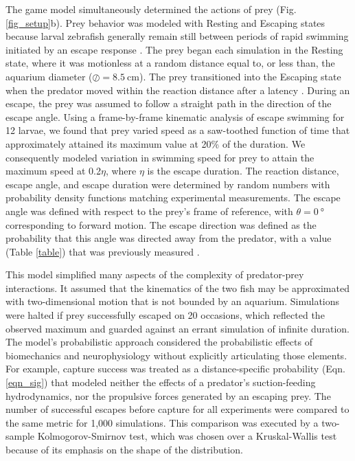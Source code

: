 \documentclass[]{rsos}%
\begin{document}
The game model simultaneously determined the actions of prey (Fig. \ref{fig_setup}b).
Prey behavior was modeled with Resting and Escaping states because larval zebrafish generally remain still between periods of rapid swimming initiated by an escape response \cite{Stewart:2013bha, Stewart:2014cma}. 
The prey began each simulation in the Resting state, where it was motionless at a random distance equal to, or less than, the aquarium diameter ($\oslash = \SI{8.5}{\cm}$).
The prey transitioned into the Escaping state when the predator moved within the reaction distance after a latency \cite{Nair:2015gk}.
During an escape, the prey was assumed to follow a straight path in the direction of the escape angle.
Using a frame-by-frame kinematic analysis of escape swimming for 12 larvae, we found that prey varied speed as a saw-toothed function of time that approximately attained its maximum value at 20\% of the duration. 
We consequently modeled variation in swimming speed for prey to attain the maximum speed at 0.2$\eta$, where $\eta$ is the escape duration. 
The reaction distance, escape angle, and escape duration were determined by random numbers with probability density functions matching experimental measurements.
The escape angle was defined with respect to the prey's frame of reference, with $\theta =  \SI{0}{\degree}$ corresponding to forward motion.
The escape direction was defined as the probability that this angle was directed away from the predator, with a value (Table \ref{table}) that was previously measured \cite{Stewart:2014cma}.

This model simplified many aspects of the complexity of predator-prey interactions.
It assumed that the kinematics of the two fish may be approximated with two-dimensional motion that is not bounded by an aquarium. 
Simulations were halted if prey successfully escaped on 20 occasions, which reflected the observed maximum and guarded against an errant simulation of infinite duration.
The model's probabilistic approach considered the probabilistic effects of biomechanics and neurophysiology without explicitly articulating those elements.
For example, capture success was treated as a distance-specific probability (Eqn. \ref{eqn_sig}) that modeled neither the effects of a predator's suction-feeding hydrodynamics, nor the propulsive forces generated by an escaping prey.
The number of successful escapes before capture for all experiments were compared to the same metric for 1,000 simulations.  
This comparison was executed by a two-sample Kolmogorov-Smirnov test, which was chosen over a Kruskal-Wallis test because of its emphasis on the shape of the distribution.  
\end{document}

